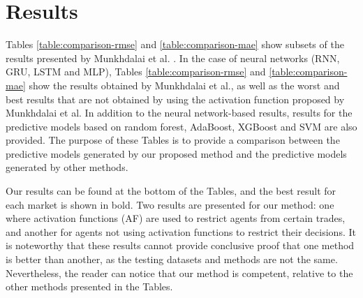 \documentclass{ieeeaccess}
\begin{document}
\section{Results}
\label{section:results}

Tables \ref{table:comparison-rmse} and \ref{table:comparison-mae} show
subsets of the results presented by Munkhdalai et
al. \cite{Munkhdalai2019}. In the case of neural networks (RNN, GRU,
LSTM and MLP), Tables \ref{table:comparison-rmse} and
\ref{table:comparison-mae} show the results obtained by Munkhdalai et
al., as well as the worst and best results that are not obtained by
using the activation function proposed by Munkhdalai et al. In
addition to the neural network-based results, results for the
predictive models based on random forest, AdaBoost, XGBoost and
SVM are also provided. The purpose of these Tables
is to provide a comparison between the predictive models generated by
our proposed method and the predictive models generated by other
methods.

Our results can be found at the bottom of the Tables, and the best
result for each market is shown in bold. Two results are presented for
our method: one where activation functions (AF) are used to restrict agents
from certain trades, and another for agents not using activation
functions to restrict their decisions. It is noteworthy that these
results cannot provide conclusive proof that one method is better than
another, as the testing datasets and methods are not the
same. Nevertheless, the reader can notice that our method is
competent, relative to the other methods presented in the Tables.

\end{document}
